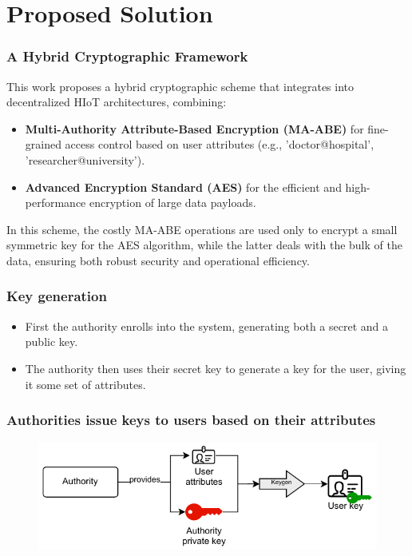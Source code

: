 \documentclass{beamer}
\begin{document}
\section{Proposed Solution}

\begin{frame}
\frametitle{A Hybrid Cryptographic Framework}
This work proposes a hybrid cryptographic scheme that integrates into decentralized HIoT architectures, combining:
\begin{itemize}
\item \textbf{Multi-Authority Attribute-Based Encryption (MA-ABE)} for fine-grained access control based on user attributes (e.g., 'doctor@hospital', 'researcher@university').
\item \textbf{Advanced Encryption Standard (AES)} for the efficient and high-performance encryption of large data payloads.
\end{itemize}
In this scheme, the costly MA-ABE operations are used only to encrypt a small symmetric key for the AES algorithm, while the latter deals with the bulk of the data, ensuring both robust security and operational efficiency.
\end{frame}

\begin{frame}
\frametitle{Key generation}
\begin{itemize}
\item First the authority enrolls into the system, generating both a secret and a public key.
\item The authority then uses their secret key to generate a key for the user, giving it some set of attributes.
\end{itemize}
\end{frame}

\begin{frame}
\frametitle{Authorities issue keys to users based on their attributes}
\begin{figure}
\includegraphics[width=\textwidth,height=0.7\textheight,keepaspectratio]{images/diagrams/keygen_diagram.pdf}
\end{figure}
\end{frame}
\end{document}
